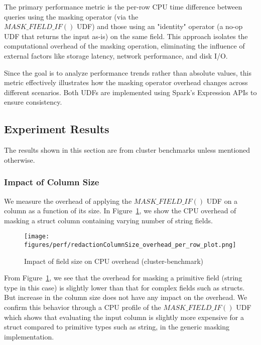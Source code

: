 The primary performance metric is the per-row CPU time difference between queries using the masking operator (via the \\ $MASK\_FIELD\_IF()$ UDF) and those using an "identity" operator (a no-op UDF that returns the input as-is) on the same field. This approach isolates the computational overhead of the masking operation, eliminating the influence of external factors like storage latency, network performance, and disk I/O.

Since the goal is to analyze performance trends rather than absolute values, this metric effectively illustrates how the masking operator overhead changes across different scenarios. Both UDFs are implemented using Spark's Expression APIs to ensure consistency.

\subsection{Experiment Results}

The results shown in this section are from cluster benchmarks unless mentioned otherwise.

\subsubsection{Impact of Column Size} 
We measure the overhead of applying the $MASK\_FIELD\_IF()$ UDF on a column as a function of its size. In
Figure~\ref{fig:PerfRedactedFieldSize}, we show the CPU overhead of masking a struct column containing varying number of
string fields. 
\begin{figure}[ht]  %
    \texttt{[image: figures/perf/redactionColumnSize\_overhead\_per\_row\_plot.png]}
    \vspace{-1em}
    \caption{Impact of field size on CPU overhead (cluster-benchmark)}  %
    \label{fig:PerfRedactedFieldSize}  %
    \vspace{-2em}
\end{figure}
From Figure~\ref{fig:PerfRedactedFieldSize}, we see that the overhead for masking a primitive field (string type in this case) is slightly lower than that for 
complex fields such as structs. But increase in the column size does not have any impact on the overhead. We confirm this behavior through a CPU profile of the $MASK\_FIELD\_IF()$ UDF which shows that 
evaluating the input column is slightly more expensive for a struct compared to primitive types such as string, in the generic masking implementation. \\

